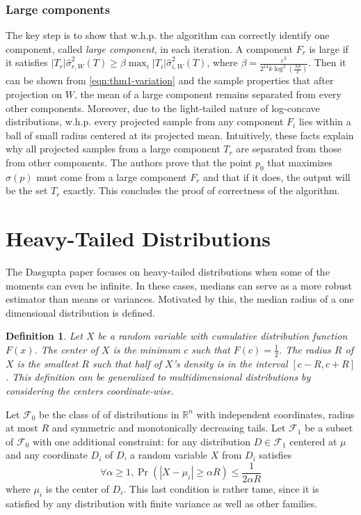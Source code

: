 \documentclass[11pt,letter]{article}
\newtheorem{definition}{Definition}
\begin{document}
\subsubsection*{Large components}

The key step is to show that w.h.p. the algorithm can correctly identify one component, called \emph{large component}, in each iteration. A component $F_r$ is large if it satisfies $|T_r| \hat \sigma_{r, W}^2(T) \ge \beta \max_i|T_i| \hat \sigma_{i, W}^2(T)$, where $\beta = \frac{\varepsilon^3}{2^{14}k \log^2(\frac{Nk}{\delta})}$. Then it can be shown from \eqref{eqn:thm1-variation} and the sample properties that after projection on $W$, the mean of a large component remains separated from every other components. Moreover, due to the light-tailed nature of log-concave distributions, w.h.p. every projected sample from any component $F_i$ lies within a ball of small radius centered at its projected mean. Intuitively, these facts explain why all projected samples from a large component $T_r$ are separated from those from other components. The authors prove that the point $p_0$ that maximizes $\sigma(p)$ must come from a large component $F_r$ and that if it does, the output will be the set $T_r$ exactly. This concludes the proof of correctness of the algorithm.





\section{Heavy-Tailed Distributions}

The Dasgupta paper \cite{Dasgupta05heavy-tail} focuses on heavy-tailed distributions when some of the  moments can even be infinite. In these cases, medians can serve as a more robust estimator than means or variances. Motivated by this, the median radius of a one dimensional distribution is defined. 

\begin{definition}
Let $X$ be a random variable with cumulative distribution function $F(x)$. The center of $X$ is the minimum $c$ such that $F(c) = \frac{1}{2}$. The radius $R$ of $X$ is the smallest $R$ such that half of $X$'s density is in the interval $[c-R, c+R]$. This definition can be generalized to multidimensional distributions by considering the centers coordinate-wise. 
\end{definition}

Let $\mathcal F_0$ be the class of of distributions in $\mathbb{R}^n$ with independent coordinates, radius at most $R$ and symmetric and monotonically decreasing tails. Let $\mathcal F_1$ be a subset of $\mathcal F_0$ with one additional constraint: for any distribution $D \in \mathcal F_1$ centered at ${\mu}$ and any coordinate $D_i$ of $D$, a random variable $X$ from $D_i$ satisfies 
$$ \forall \alpha \geq 1, \Pr{(|X-\mu_i| \geq \alpha R)} \leq \frac{1}{2\alpha R}$$
where $\mu_i$ is the center of $D_i$.
This last condition is rather tame, since it is satisfied by any distribution with finite variance as well as other families.
\end{document}
